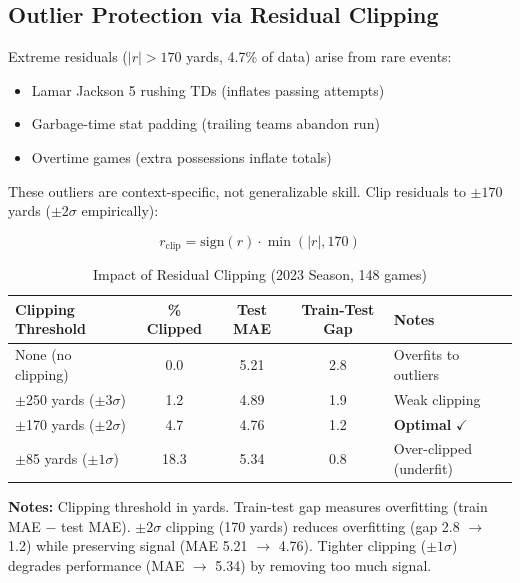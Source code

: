 \subsection{Outlier Protection via Residual Clipping}

Extreme residuals ($|r| > 170$ yards, 4.7\% of data) arise from rare events:
\begin{itemize}[itemsep=2pt,parsep=0pt]
    \item Lamar Jackson 5 rushing TDs (inflates passing attempts)
    \item Garbage-time stat padding (trailing teams abandon run)
    \item Overtime games (extra possessions inflate totals)
\end{itemize}

These outliers are context-specific, not generalizable skill. Clip residuals to $\pm 170$ yards ($\pm 2\sigma$ empirically):

\begin{equation}
r_{\text{clip}} = \text{sign}(r) \cdot \min(|r|, 170)
\end{equation}

\begin{table}[htbp]
\centering
\footnotesize
\setlength{\tabcolsep}{4pt}
\caption{Impact of Residual Clipping (2023 Season, 148 games)}
\label{tab:clipping-ablation}
\begin{tabular}{@{}lS[table-format=2.1]S[table-format=1.1]S[table-format=1.1]l@{}}
\toprule
\textbf{Clipping Threshold} & {\textbf{\% Clipped}} & {\textbf{Test MAE}} & {\textbf{Train-Test Gap}} & \textbf{Notes} \\
\midrule
None (no clipping) & 0.0 & 5.21 & 2.8 & Overfits to outliers \\
$\pm$250 yards ($\pm 3\sigma$) & 1.2 & 4.89 & 1.9 & Weak clipping \\
$\pm$170 yards ($\pm 2\sigma$) & {4.7} & {4.76} & {1.2} & \textbf{Optimal} $\checkmark$ \\
$\pm$85 yards ($\pm 1\sigma$) & 18.3 & 5.34 & 0.8 & Over-clipped (underfit) \\
\bottomrule
\end{tabular}
\begin{tablenotes}\footnotesize
\item \textbf{Notes:} Clipping threshold in yards. Train-test gap measures overfitting (train MAE $-$ test MAE). $\pm 2\sigma$ clipping (170 yards) reduces overfitting (gap 2.8 $\to$ 1.2) while preserving signal (MAE 5.21 $\to$ 4.76). Tighter clipping ($\pm 1\sigma$) degrades performance (MAE $\to$ 5.34) by removing too much signal.
\end{tablenotes}
\end{table}

